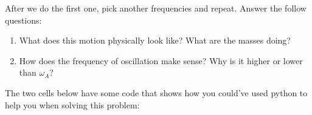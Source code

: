 \documentclass[letterpaper,10pt,english]{jupyterBook}
\begin{document}
\sphinxAtStartPar
After we do the first one, pick another frequencies and repeat. Answer the follow questions:
\begin{enumerate}
%
\item {} 
\sphinxAtStartPar
What does this motion physically look like? What are the masses doing?

\item {} 
\sphinxAtStartPar
How does the frequency of oscillation make sense? Why is it higher or lower than \(\omega_A\)?

\end{enumerate}

\sphinxAtStartPar
The two cells below have some code that shows how you could’ve used python to help you when solving this problem:
\end{document}
